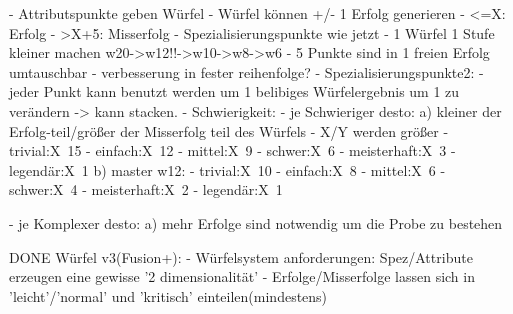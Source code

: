 		- Attributspunkte geben Würfel
			- Würfel können +/- 1 Erfolg generieren
			- <=X: Erfolg
			- >X+5: Misserfolg
		- Spezialisierungspunkte wie jetzt
			- 1 Würfel 1 Stufe kleiner machen
				w20->w12!!->w10->w8->w6
			- 5 Punkte sind in 1 freien Erfolg umtauschbar
			- verbesserung in fester reihenfolge?
		- Spezialisierungspunkte2:
			- jeder Punkt kann benutzt werden um 1 belibiges Würfelergebnis um 1 zu verändern
				-> kann stacken.
		- Schwierigkeit:
			- je Schwieriger desto:
				a) kleiner der Erfolg-teil/größer der Misserfolg teil des Würfels
					- X/Y werden größer
					- trivial:X~15
					- einfach:X~12
					- mittel:X~9
					- schwer:X~6
					- meisterhaft:X~3
					- legendär:X~1
				b) master w12:
					- trivial:X~10
					- einfach:X~8
					- mittel:X~6
					- schwer:X~4
					- meisterhaft:X~2
					- legendär:X~1

			- je Komplexer desto:
				a) mehr Erfolge sind notwendig um die Probe zu bestehen
				
				
				
				
								
DONE Würfel v3(Fusion+):
   - Würfelsystem anforderungen: Spez/Attribute erzeugen eine gewisse '2 dimensionalität'
   - Erfolge/Misserfolge lassen sich in 'leicht'/'normal' und 'kritisch' einteilen(mindestens)

